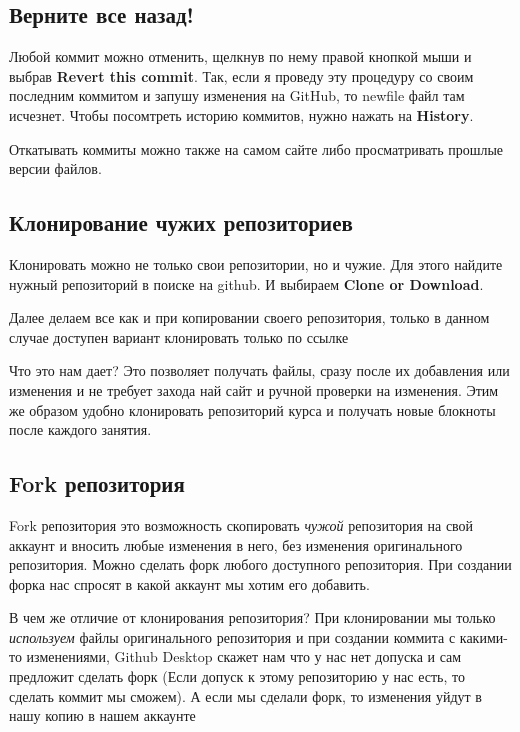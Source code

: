 \documentclass[11pt]{article}
\begin{document}
    \subsection{Верните все
назад!}\label{ux432ux435ux440ux43dux438ux442ux435-ux432ux441ux435-ux43dux430ux437ux430ux434}

Любой коммит можно отменить, щелкнув по нему правой кнопкой мыши и
выбрав \textbf{Revert this commit}. Так, если я проведу эту процедуру со
своим последним коммитом и запушу изменения на GitHub, то newfile файл
там исчезнет. Чтобы посомтреть историю коммитов, нужно нажать на
\textbf{History}.

Откатывать коммиты можно также на самом сайте либо просматривать прошлые
версии файлов.

    \subsection{Клонирование чужих
репозиториев}\label{ux43aux43bux43eux43dux438ux440ux43eux432ux430ux43dux438ux435-ux447ux443ux436ux438ux445-ux440ux435ux43fux43eux437ux438ux442ux43eux440ux438ux435ux432}

Клонировать можно не только свои репозитории, но и чужие. Для этого
найдите нужный репозиторий в поиске на github. И выбираем \textbf{Clone
or Download}.

Далее делаем все как и при копировании своего репозитория, только в
данном случае доступен вариант клонировать только по ссылке

Что это нам дает? Это позволяет получать файлы, сразу после их
добавления или изменения и не требует захода най сайт и ручной проверки
на изменения. Этим же образом удобно клонировать репозиторий курса и
получать новые блокноты после каждого занятия.

    \subsection{Fork
репозитория}\label{fork-ux440ux435ux43fux43eux437ux438ux442ux43eux440ux438ux44f}

Fork репозитория это возможность скопировать \emph{чужой} репозитория на
свой аккаунт и вносить любые изменения в него, без изменения
оригинального репозитория. Можно сделать форк любого доступного
репозитория. При создании форка нас спросят в какой аккаунт мы хотим его
добавить.

В чем же отличие от клонирования репозитория? При клонировании мы только
\emph{используем} файлы оригинального репозитория и при создании коммита
с какими-то изменениями, Github Desktop скажет нам что у нас нет допуска
и сам предложит сделать форк (Если допуск к этому репозиторию у нас
есть, то сделать коммит мы сможем). А если мы сделали форк, то изменения
уйдут в нашу копию в нашем аккаунте
\end{document}
